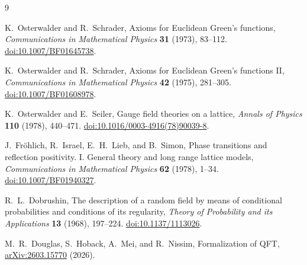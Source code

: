 \documentclass[11pt]{article}
\begin{document}
\begin{thebibliography}{9}

K.~Osterwalder and R.~Schrader,
\newblock Axioms for Euclidean Green's functions,
\newblock \emph{Communications in Mathematical Physics} \textbf{31} (1973), 83--112.
\newblock \href{https://doi.org/10.1007/BF01645738}{doi:10.1007/BF01645738}.

K.~Osterwalder and R.~Schrader,
\newblock Axioms for Euclidean Green's functions II,
\newblock \emph{Communications in Mathematical Physics} \textbf{42} (1975), 281--305.
\newblock \href{https://doi.org/10.1007/BF01608978}{doi:10.1007/BF01608978}.

K.~Osterwalder and E.~Seiler,
\newblock Gauge field theories on a lattice,
\newblock \emph{Annals of Physics} \textbf{110} (1978), 440--471.
\newblock \href{https://doi.org/10.1016/0003-4916(78)90039-8}{doi:10.1016/0003-4916(78)90039-8}.

J.~Fr\"ohlich, R.~Israel, E.~H.~Lieb, and B.~Simon,
\newblock Phase transitions and reflection positivity. I. General theory and long range lattice models,
\newblock \emph{Communications in Mathematical Physics} \textbf{62} (1978), 1--34.
\newblock \href{https://doi.org/10.1007/BF01940327}{doi:10.1007/BF01940327}.

R.~L.~Dobrushin,
\newblock The description of a random field by means of conditional probabilities and conditions of its regularity,
\newblock \emph{Theory of Probability and its Applications} \textbf{13} (1968), 197--224.
\newblock \href{https://doi.org/10.1137/1113026}{doi:10.1137/1113026}.

M.~R.~Douglas, S.~Hoback, A.~Mei, and R.~Nissim,
\newblock Formalization of QFT,
\newblock \href{https://arxiv.org/abs/2603.15770}{arXiv:2603.15770} (2026).

\end{thebibliography}
\end{document}
